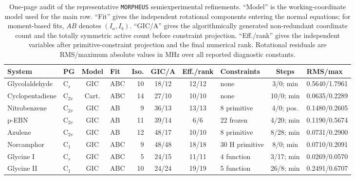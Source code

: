 \begin{table}
\caption{One-page audit of the representative \texttt{MORPHEUS}
semiexperimental refinements. ``Model'' is the working-coordinate model used
for the main row. ``Fit'' gives the independent rotational components entering
the normal equations; for moment-based fits, $AB$ denotes $(I_a,I_b)$. ``GIC/A''
gives the algorithmically generated non-redundant coordinate count and the
totally symmetric active count before constraint projection. ``Eff./rank''
gives the independent variables after primitive-constraint projection and the
final numerical rank. Rotational residuals are RMS/maximum absolute values in
MHz over all reported diagnostic constants.}
\label{tab:benchmark-summary}
\scriptsize
\setlength{\tabcolsep}{2.0pt}
\begin{tabular}{@{}llclrcclcl@{}}
\toprule
System & PG & Model & Fit & Iso. & GIC/A & Eff./rank & Constraints & Steps & RMS/max \\
\midrule
Glycolaldehyde & C$_s$ & GIC & ABC & 10 & 18/12 & 12/12 & none & 3/0; min & 0.5640/1.7961 \\
Cyclopentadiene & C$_{2v}$ & Cart. & ABC & 14 & 27/10 & 10/10 & none & 10/0; min & 0.0635/0.2289 \\
Nitrobenzene & C$_{2v}$ & GIC & AB & 9 & 36/13 & 13/13 & 8 primitive & 4/0; pos. & 0.1480/0.2605 \\
p-EBN & C$_{2v}$ & GIC & AB & 11 & 39/14 & 6/6 & 22 frozen & 4/20; min & 0.1190/0.5674 \\
Azulene & C$_{2v}$ & GIC & AB & 12 & 48/17 & 10/10 & 8 primitive & 8/28; min & 0.0731/0.2900 \\
Norcamphor & C$_1$ & GIC & ABC & 9 & 48/48 & 18/18 & 30 H primitive & 8/0; min & 0.0710/0.2091 \\
Glycine I & C$_s$ & GIC & ABC & 5 & 24/15 & 11/11 & 4 function & 3/17; min & 0.0269/0.0570 \\
Glycine II & C$_1$ & GIC & ABC & 10 & 24/24 & 19/19 & 5 function & 26/8; min & 0.2491/0.6707 \\
\bottomrule
\end{tabular}
\end{table}
